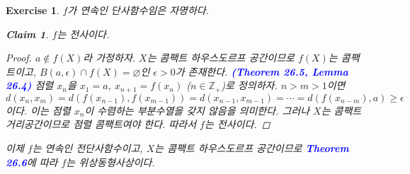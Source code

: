 \documentclass{article}
\newtheorem{exercise}{Exercise}[section]
\newtheorem*{claim}{Claim}
\newcommand{\Z}{\mathbb{Z}}
\begin{document}
\begin{exercise}
    $f$가 연속인 단사함수임은 자명하다.
    \begin{claim}
        $f$는 전사이다.
    \end{claim}
    \begin{proof}
        $a\notin f(X)$라 가정하자. $X$는 콤팩트 하우스도르프 공간이므로 $f(X)$는 콤팩트이고, $B(a,\epsilon)\cap f(X)=\varnothing$인 $\epsilon>0$가 존재한다. \textcolor{blue}{\textbf{(Theorem 26.5, Lemma 26.4)}} 점렬 $x_n$을 $x_1=a$, $x_{n+1}=f(x_n)$ ($n\in\Z_+$)로 정의하자. $n>m>1$이면
        \[
            d(x_n,x_m)=d(f(x_{n-1}),f(x_{m-1}))=d(x_{n-1},x_{m-1})=\cdots=d(f(x_{n-m}),a)\geq\epsilon
        \]
        이다. 이는 점렬 $x_n$이 수렴하는 부분수열을 갖지 않음을 의미한다. 그러나 $X$는 콤팩트 거리공간이므로 점렬 콤팩트여야 한다. 따라서 $f$는 전사이다.
    \end{proof}
    \noindent 이제 $f$는 연속인 전단사함수이고, $X$는 콤팩트 하우스도르프 공간이므로 \textcolor{blue}{\textbf{Theorem 26.6}}에 따라 $f$는 위상동형사상이다.
\end{exercise}
\end{document}
